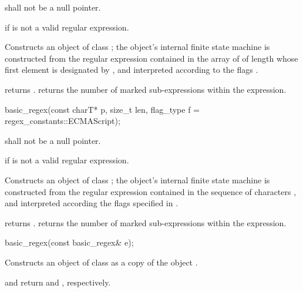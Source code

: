 \begin{itemdescr}
\pnum
\requires  {} shall not be a null pointer.

\pnum
\throws  {} if  is not a valid regular expression.

\pnum
\effects  Constructs an object of class ; the object's
internal finite state machine is constructed from the regular
expression contained in the array of  of length
 whose first element is
designated by , and interpreted according to the flags .

\pnum\ensures
{} returns .
 returns the number of marked sub-expressions
within the expression.
\end{itemdescr}

%
\begin{itemdecl}
basic_regex(const charT* p, size_t len, flag_type f = regex_constants::ECMAScript);
\end{itemdecl}

\begin{itemdescr}
\pnum
\requires  {} shall not be a null pointer.

\pnum
\throws  {} if  is not a valid regular expression.

\pnum
\effects  Constructs an object of class ; the object's
internal finite state machine is constructed from the regular
expression contained in the sequence of characters , and
interpreted according the flags specified in .

\pnum\ensures
{} returns .
 returns the number of marked sub-expressions
within the expression.
\end{itemdescr}

%
\begin{itemdecl}
basic_regex(const basic_regex& e);
\end{itemdecl}

\begin{itemdescr}
\pnum
\effects  Constructs an object of class  as a copy of
the object .

\pnum\ensures
{} and  return
 and , respectively.
\end{itemdescr}

